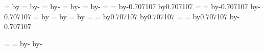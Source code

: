 {  %
  {
    \pgf@process{\radius}
    \pgf@ya=\pgf@y%
    \pgf@process{\centerpoint}
    \advance\pgf@y by\pgf@ya
  }%
  {
    \pgf@process{\radius}
    \pgf@ya=\pgf@y%
    \pgf@process{\centerpoint}
    \advance\pgf@y by-\pgf@ya
  }%
  {
    \pgf@process{\radius}
    \pgf@xa=\pgf@x%
    \pgf@process{\centerpoint}
    \advance\pgf@x by-\pgf@xa
  }%
  {%
    \pgf@process{\radius}
    \pgf@xa=\pgf@x%
    \pgf@process{\centerpoint}
    \advance\pgf@x by-\pgf@xa%
    \pgfmathsetlength\pgf@y{.5ex}
  }%
  {%
    \pgf@process{\radius}
    \pgf@xa=\pgf@x%
    \pgf@process{\centerpoint}
    \advance\pgf@x by-\pgf@xa%
    \pgf@y=0pt
  }%
  {
    \pgf@process{\radius}
    \pgf@xa=\pgf@x%
    \pgf@ya=\pgf@y%
    \pgf@process{\centerpoint}
    \advance\pgf@x by-0.707107\pgf@xa
    \advance\pgf@y by0.707107\pgf@ya
  }%
  {
    \pgf@process{\radius}
    \pgf@xa=\pgf@x%
    \pgf@ya=\pgf@y%
    \pgf@process{\centerpoint}
    \advance\pgf@x by-0.707107\pgf@xa
    \advance\pgf@y by-0.707107\pgf@ya
  }%
  {%
    \pgf@process{\radius}
    \pgf@xa=\pgf@x%
    \pgf@process{\centerpoint}
    \advance\pgf@x by\pgf@xa
  }%
  {%
    \pgf@process{\radius}
    \pgf@xa=\pgf@x%
    \pgf@process{\centerpoint}
    \advance\pgf@x by\pgf@xa%
    \pgfmathsetlength\pgf@y{.5ex}
  }%
  {%
    \pgf@process{\radius}
    \pgf@xa=\pgf@x%
    \pgf@process{\centerpoint}
    \advance\pgf@x by\pgf@xa%
    \pgf@y=0pt
  }%
  {
    \pgf@process{\radius}
    \pgf@xa=\pgf@x%
    \pgf@ya=\pgf@y%
    \pgf@process{\centerpoint}
    \advance\pgf@x by0.707107\pgf@xa
    \advance\pgf@y by0.707107\pgf@ya
  }%
  {
    \pgf@process{\radius}
    \pgf@xa=\pgf@x%
    \pgf@ya=\pgf@y%
    \pgf@process{\centerpoint}
    \advance\pgf@x by0.707107\pgf@xa
    \advance\pgf@y by-0.707107\pgf@ya
  }%

  \backgroundpath
  {
    \pgf@process{\radius}%
    \pgfutil@tempdima=\pgf@x%
    \pgfutil@tempdimb=\pgf@y%
    \advance\pgfutil@tempdima by-\pgf@xb%
    \advance\pgfutil@tempdimb by-\pgf@yb%
    \pgfpathellipse{\centerpoint}{\pgfqpoint{\pgfutil@tempdima}{0pt}}{\pgfqpoint{0pt}{\pgfutil@tempdimb}}%
  }%
}%





